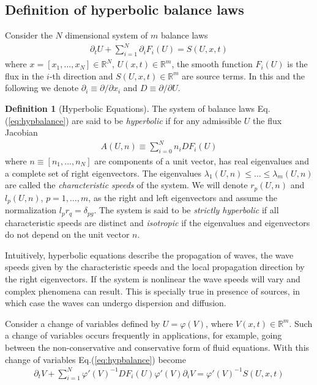 \documentclass[11pt, reqno]{amsart}
\newcommand{\eqr}[1]{Eq.\thinspace(#1)}
\newcommand{\spfrac}[2]{{\partial_{#1}} {#2}}
\theoremstyle{definition}
\newtheorem{dfn}{Definition}
\begin{document}
\subsection{Definition of hyperbolic balance laws}

Consider the $N$ dimensional system of $m$ balance laws
\begin{align}
  \spfrac{t}{U} + \sum_{i=1}^N \spfrac{i}{F_i(U)} = S(U,x,t) 
  \label{eq:hypbalance}
\end{align}
where $x = [x_1,\ldots,x_N] \in \mathbb{R}^N$, $U(x,t) \in
\mathbb{R}^m$, the smooth function $F_i(U)$ is the flux in the $i$-th
direction and $S(U,x,t) \in \mathbb{R}^m$ are source terms. In this
and the following we denote $\partial_i \equiv \partial/\partial x_i$
and $D \equiv \partial/\partial U$.

\begin{dfn}[Hyperbolic Equations]
  The system of balance laws \eqr{\ref{eq:hypbalance}} are said to be
  \emph{hyperbolic} if for any admissible $U$ the flux Jacobian
  \begin{align}
    A(U,n) \equiv \sum_{i=0}^N n_i DF_i(U)
  \end{align}
  where $n\equiv [n_1,\ldots,n_N]$ are components of a unit vector,
  has real eigenvalues and a complete set of right eigenvectors. The
  eigenvalues $\lambda_1(U,n) \le \ldots \le \lambda_m(U,n)$ are
  called the \emph{characteristic speeds} of the system. We will
  denote $r_p(U,n)$ and $l_p(U,n)$, $p=1,\ldots,m$, as the right and
  left eigenvectors and assume the normalization $l_p r_q =
  \delta_{pg}$.  The system is said to be \emph{strictly hyperbolic}
  if all characteristic speeds are distinct and \emph{isotropic} if
  the eigenvalues and eigenvectors do not depend on the unit vector
  $n$.
\end{dfn}

Intuitively, hyperbolic equations describe the propagation of waves,
the wave speeds given by the characteristic speeds and the local
propagation direction by the right eigenvectors. If the system is
nonlinear the wave speeds will vary and complex phenomena can
result. This is specially true in presence of sources, in which case
the waves can undergo dispersion and diffusion.

Consider a change of variables defined by $U=\varphi(V)$, where
$V(x,t) \in \mathbb{R}^m$. Such a change of variables occurs
frequently in applications, for example, going between the
non-conservative and conservative form of fluid equations. With this
change of variables \eqr{\ref{eq:hypbalance}} become
\begin{align}
  \spfrac{t}{V} + \sum_{i=1}^N 
  \varphi'(V)^{-1}
  DF_i(U)
  \varphi'(V)
  \spfrac{i}{V}
  = 
  \varphi'(V)^{-1}S(U,x,t)
  \label{eq:hypbalance}
\end{align}
\end{document}
